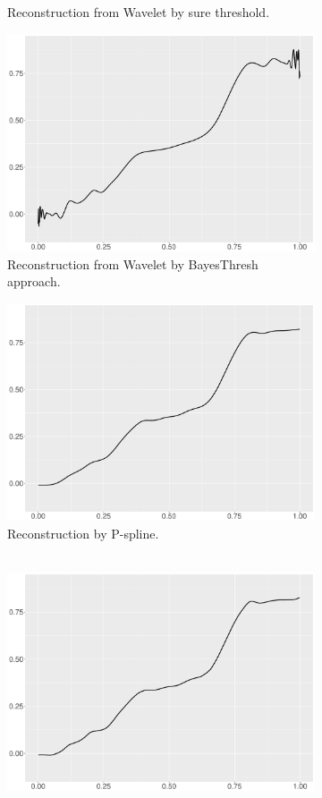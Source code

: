 \begin{figure}
\begin{subfigure}{0.45\textwidth}
    \caption{Reconstruction from Wavelet by sure threshold.}
    \end{subfigure}
    \begin{subfigure}{0.45\textwidth}
    \centering
    \includegraphics[width=\linewidth,height=0.45\textwidth]{Chapters/02TractorSplineTheory/plot/ggplot/ggBlocksBayes.pdf}
    \caption{Reconstruction from Wavelet by BayesThresh approach.}
    \end{subfigure}
    \begin{subfigure}{0.45\textwidth}
    \centering
    \includegraphics[width=\linewidth,height=0.45\textwidth]{Chapters/02TractorSplineTheory/plot/ggplot/ggBlocksPSpline.pdf}
    \caption{Reconstruction by P-spline. \\\mbox{  } }
    \end{subfigure}
    \begin{subfigure}{0.45\textwidth}
    \centering
    \includegraphics[width=\linewidth,height=0.45\textwidth]{Chapters/02TractorSplineTheory/plot/ggplot/ggBlocksGamma.pdf}

\end{subfigure}
\end{figure}
